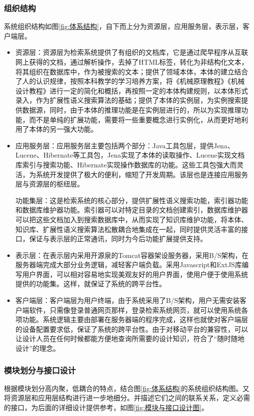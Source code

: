 \documentclass[12pt,a4paper]{article}
\begin{document}
		\subsubsection{组织结构}
	系统组织结构如图\ref{fig:体系结构}，自下而上分为资源层，应用服务层，表示层，客户端层。
\begin{itemize}
	 	\item
	资源层：资源层为检索系统提供了有组织的文档库，它是通过爬早程序从互联网上获得的文档，通过解析操作，去掉了HTML标签，转化为非结构化文本，将其组织在数据库中，作为被搜索的文本；提供了领域本体，本体的建立结合了人的认识规律，按照本科教学的学习培养方案，将《机械原理教程》《机械设计教程》进行一定的简化和概括，再按照一定的本体构建规则，以本体形式录入，作为扩展性语义搜索算法的基础；提供了本体的实例层，为实例搜索提供数据源，同时，由于本体的推理功能是在实例层进行的，所以为实现推理功能，而不是单纯的扩展功能，需要将一些重要概念进行实例化，从而更好地利用了本体的另一强大功能。
		\item
	应用服务层：应用服务层主要包括两个部分：Java工具包层，提供Jena、Lucene、Hibernate等工具包，Jena实现了本体的读取操作、Lucene实现文档库索引与搜索功能、Hibernate实现操作数据库的功能。这些工具包强大而灵活，为系统开发提供了极大的便利，缩短了开发周期。该层也是连接应用服务层与资源层的枢纽层。
	
	功能集层：这是检索系统的核心部分，提供扩展性语义搜索功能，索引器功能和数据库维护器功能。索引器可以对特定目录的文档创建索引，数据库维护器可以把这些文档加入到搜索数据库中，从而实现了知识库维护功能，将本体、知识库、扩展性语义搜索算法松散耦合地集成在一起，同时提供灵活丰富的接口，保证与表示层的正常通讯，同时为今后功能扩展提供支持。
		\item
	表示层：在表示层内采用开源泉的Tomcat容器架设服务器，采用B/S架构，在服务器端完成大部分业务逻辑，减轻客户端负载。采用Javascript和ExtJS库编写用户界面，可以相对容易地实现美观友好的用户界面，使用户便于使用系统提供的功能集。这样，就保证了系统的跨平台性。
		\item
	客户端层：客户端层为用户终端，由于系统采用了B/S架构，用户无需安装客户端软件，只需像登录普通网页那样，登录检索系统网页，就可以使用系统各项功能。系统逻辑主要由部署在服务器端的程序完成，这样也就使对客户端层的设备配置要求低，保证了系统的跨平台性。由于对移动平台的兼容性，可以让设计人员在任何时候都能方便地查询所需要的设计知识，符合了“随时随地设计”的理念。
	
	\end{itemize}
	
		\subsubsection{模块划分与接口设计}
	根据模块划分高内聚，低耦合的特点，结合图\ref{fig:体系结构}的系统组织结构图。又将资源层和应用层结构进行进一步地细分。并描述它们之间的联系关系，定义必需的接口，为后面的详细设计提供参考，如图\ref{fig:模块与接口设计图}。
	
\end{document}
